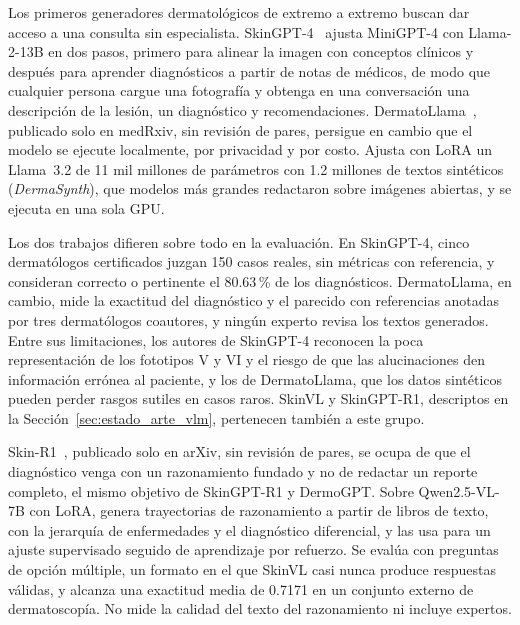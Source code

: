 Los primeros generadores dermatológicos de extremo a extremo buscan dar acceso a una consulta sin especialista.
SkinGPT-4~\cite{zhou2024pretrained} ajusta MiniGPT-4 con Llama-2-13B en dos pasos, primero para alinear la imagen
con conceptos clínicos y después para aprender diagnósticos a partir de notas de médicos, de modo que cualquier
persona cargue una fotografía y obtenga en una conversación una descripción de la lesión, un diagnóstico y
recomendaciones.
DermatoLlama~\cite{yilmaz2025resourceefficient}, publicado solo en medRxiv, sin revisión de pares, persigue en
cambio que el modelo se ejecute localmente, por privacidad y por costo. Ajusta con LoRA un Llama~3.2 de 11 mil
millones de parámetros con 1.2 millones de textos sintéticos (\emph{DermaSynth}), que modelos más grandes redactaron
sobre imágenes abiertas, y se ejecuta en una sola GPU.

Los dos trabajos difieren sobre todo en la evaluación. En
SkinGPT-4, cinco dermatólogos certificados juzgan 150 casos reales, sin métricas con referencia, y consideran
correcto o pertinente el 80.63\,\% de los diagnósticos. DermatoLlama, en cambio, mide la exactitud del diagnóstico
y el parecido con referencias anotadas por tres dermatólogos coautores, y ningún experto revisa los textos
generados. Entre sus limitaciones, los autores de SkinGPT-4 reconocen la poca representación de los fototipos V y VI
y el riesgo de que las alucinaciones den información errónea al paciente, y los de DermatoLlama, que los datos
sintéticos pueden perder rasgos sutiles en casos raros. SkinVL y SkinGPT-R1, descriptos en la
Sección~\ref{sec:estado_arte_vlm}, pertenecen también a este grupo.

Skin-R1~\cite{liu2025skinr1}, publicado solo en arXiv, sin revisión de pares, se ocupa de que el diagnóstico venga
con un razonamiento fundado y no de redactar un reporte completo, el mismo objetivo de SkinGPT-R1 y DermoGPT. Sobre
Qwen2.5-VL-7B con LoRA, genera trayectorias de razonamiento a partir de libros de texto, con la jerarquía de
enfermedades y el diagnóstico diferencial, y las usa para un ajuste supervisado seguido de aprendizaje por refuerzo.
Se evalúa con preguntas de opción múltiple, un formato en el que SkinVL casi nunca produce respuestas válidas, y
alcanza una exactitud media de 0.7171 en un conjunto externo de dermatoscopía. No mide la calidad del texto del
razonamiento ni incluye expertos.

